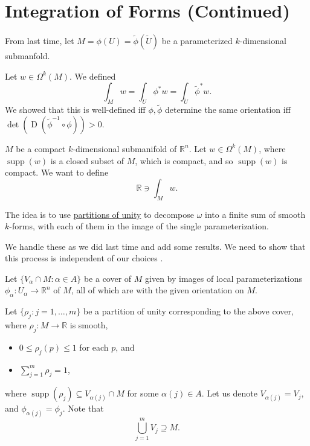 \documentclass[notoc,notitlepage]{tufte-book}
\DeclareMathOperator{\D}{D}
\DeclareMathOperator{\supp}{supp}
\begin{document}
\section{Integration of Forms (Continued)}%
\label{sec:integration_of_forms_continued}

From last time, let $M = \phi(U) = \tilde{\phi}(\tilde{U})$ be a parameterized
$k$-dimensional submanfold.

Let $w \in \Omega^k(M)$. We defined
\begin{equation*}
  \int_{M} w = \int_{U} \phi^* w = \int_{\tilde{U}} \tilde{\phi}^* w .
\end{equation*}
We showed that this is well-defined iff $\phi, \tilde{\phi}$ determine the same
orientation iff $\det (\D (\tilde{\phi}^{-1} \circ \phi)) > 0$.

 $M$ be a compact $k$-dimensional submanifold of
$\mathbb{R}^n$. Let $w \in \Omega^k(M)$, where $\supp(w)$ is a closed subset of
$M$, which is compact, and so $\supp(w)$ is compact. We want to define
\begin{equation*}
  \mathbb{R} \ni \int_{M} w. 
\end{equation*}

The idea is to use \hyperref[sec:partitions_of_unity_continued]{partitions of
unity} to decompose $\omega$ into a finite sum of smooth $k$-forms, with each of them
 in the image of the single parameterization.

We handle these as we did last time and add some results. We need to show that
this process is independent of our choices .

Let $\{ V_\alpha \cap M : \alpha \in A \}$ be a cover of $M$ given by images of
local parameterizations $\phi_\alpha : U_\alpha \to \mathbb{R}^n$ of $M$, all of
which are  with the given orientation on $M$.

Let $\{ \rho_j : j = 1, \ldots, m \}$ be a partition of unity corresponding to
the above cover, where $\rho_j : M \to \mathbb{R}$ is smooth,
\begin{itemize}
  \item $0 \leq \rho_j(p) \leq 1$ for each $p$, and
  \item $\sum_{j=1}^{m} \rho_j = 1$,
\end{itemize}
where $\supp(\rho_j) \subseteq V_{\alpha(j)} \cap M$ for some $\alpha(j) \in A$.
Let us denote $V_{\alpha(j)} = V_j$, and $\phi_{\alpha(j)} = \phi_j$. Note that
\begin{equation*}
  \bigcup_{j=1}^{m} V_j \supseteq M.
\end{equation*}
\end{document}
